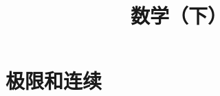 \documentclass[aspectratio=169]{ctexbeamer}
\title{数学（下）}
\begin{document}
\setcounter{part}{1}
\part{极限和连续}






\end{document}
